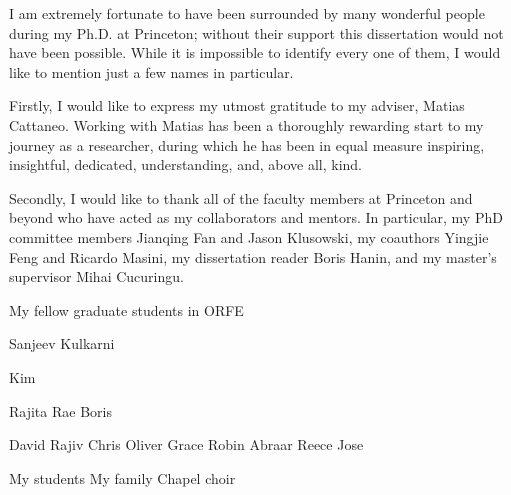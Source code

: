 
\TODO{}

I am extremely fortunate to have been surrounded by many wonderful people during
my Ph.D. at Princeton; without their support this dissertation
would not have been possible. While it is impossible to identify every one of
them, I would like to mention just a few names in particular.

Firstly, I would like to express my utmost gratitude to my adviser,
Matias Cattaneo. Working with Matias has been a thoroughly rewarding start to my
journey as a researcher, during which he has been in equal measure inspiring,
insightful, dedicated, understanding, and, above all, kind.

Secondly, I would like to thank all of the faculty members at
Princeton and beyond who have acted as my collaborators and mentors.
In particular, my PhD committee members
Jianqing Fan and Jason Klusowski,
my coauthors Yingjie Feng and Ricardo Masini,
my dissertation reader Boris Hanin,
and my master's supervisor Mihai Cucuringu.

My fellow graduate students in ORFE

Sanjeev Kulkarni

Kim

Rajita
Rae
Boris

David
Rajiv
Chris
Oliver
Grace
Robin
Abraar
Reece
Jose

My students
My family
Chapel choir
